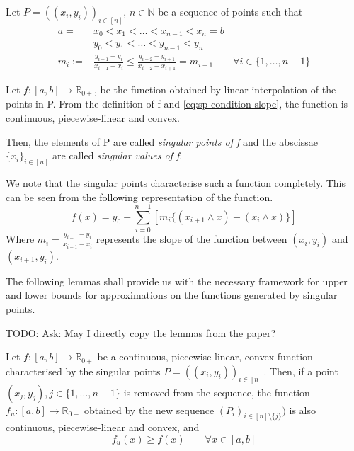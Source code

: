 \begin{dfn}
	Let $ P = \left( (x_i, y_i) \right)_{i \in [n]} $, $ n \in \mathbb{N} $ be a sequence of points such that
	\begin{subequations} \label{eq:sp-conditions}
	\begin{align}
		a =& x_0 < x_1 < \dots < x_{n-1} < x_n = b \\
		& y_0 < y_1 < \dots < y_{n-1} < y_n \\
		\label{eq:sp-condition-slope}
		m_{i} :=& \frac{y_{i+1} - y_{i}}{x_{i+1} - x_{i}} \leq \frac{y_{i+2} - y_{i+1}}{x_{i+2} - x_{i+1}} = m_{i+1} \qquad \forall i \in \{ 1, \dots, n-1 \}
	\end{align}
	\end{subequations}
	
	Let $ f:[a,b] \to \mathbb{R}_{0+} $, be the function obtained by linear interpolation of the points in P. From the definition of f and  \ref{eq:sp-condition-slope}, the function is continuous, piecewise-linear and convex.
	
	Then, the elements of P are called \emph{singular points of f} and the abscissae $ \{ x_i \}_{i \in [n]} $ are called \emph{singular values of f}.
\end{dfn}


\begin{rem}
	We note that the singular points characterise such a function completely. This can be seen from the following representation of the function.
	\begin{equation}
	\label{eq:function-repr}
	f(x) = y_0 + \sum_{i=0}^{n-1} [ m_i \{ (x_{i+1} \wedge x) - (x_{i} \wedge x) \} ]
	\end{equation}
	Where $ m_i = \frac{y_{i+1} - y_{i}}{x_{i+1} - x_{i}} $ represents the slope of the function between $ (x_{i}, y_{i}) $ and $ (x_{i+1}, y_{i}) $.
\end{rem}


The following lemmas shall provide us with the necessary framework for upper and lower bounds for approximations on the functions generated by singular points.

TODO: Ask: May I directly copy the lemmas from the paper?
\begin{lmm}
	\label{lmm:ub}
	Let $ f:[a,b] \to \mathbb{R}_{0+} $ be a continuous, piecewise-linear, convex function characterised by the singular points $ P = ( (x_i, y_i) )_{i \in [n]} $. Then, if a point $ (x_j, y_j), j \in \{ 1, \dots, n-1\} $ is removed from the sequence, the function $ f_u: [a,b] \to \mathbb{R}_{0+} $ obtained by the new sequence $ (P_i)_{i \in [n] \setminus \{ j \}}) $ is also continuous, piecewise-linear and convex, and
	\begin{equation}
	f_u(x) \geq f(x) \qquad \forall x \in [a,b]
	\end{equation}
\end{lmm}

